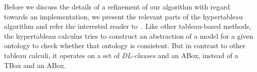 

Before we discuss the details of a refinement of our algorithm with regard towards an implementation, we
present the relevant parts of the hypertableau algorithm and refer the interested reader
to~\cite{MoSH-CADE07,MoSH-DL07,MoSH-JAIR09}. Like other tableau-based methods, the hypertableau
calculus tries to construct an abstraction of a model for a given ontology to check whether that
ontology is consistent. But in contrast to other tableau calculi, it operates on a set of
\emph{DL-clauses} and an ABox, instead of a TBox and an ABox.

